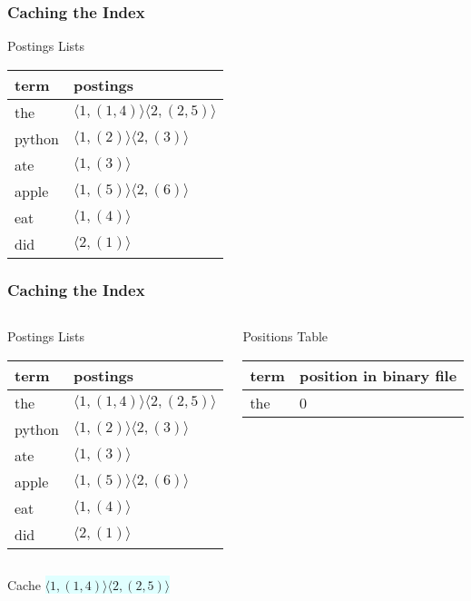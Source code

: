 \documentclass{beamer}
\begin{document}
\begin{frame}
  \frametitle{Caching the Index}

  \begin{block}{Postings Lists}
    \begin{tabular}{ l | l }
      term & postings \\ \hline
      the & $ \langle 1,(1,4) \rangle \langle 2,(2,5) \rangle $ \\
      python & $ \langle 1,(2) \rangle \langle 2,(3) \rangle $ \\
      ate & $ \langle 1,(3) \rangle $ \\
      apple & $ \langle 1,(5) \rangle \langle 2,(6) \rangle $ \\
      eat & $ \langle 1,(4) \rangle $ \\
      did & $ \langle 2,(1) \rangle $ \\
    \end{tabular}
  \end{block}

\end{frame}


\begin{frame}
  \frametitle{Caching the Index}

  \begin{columns}


    \begin{block}{Postings Lists}
      \begin{tabular}{ l | l }
        term & postings \\ \hline
        \rowcolor{LightCyan}
        the & $ \langle 1,(1,4) \rangle \langle 2,(2,5) \rangle $ \\
        python & $ \langle 1,(2) \rangle \langle 2,(3) \rangle $ \\
        ate & $ \langle 1,(3) \rangle $ \\
        apple & $ \langle 1,(5) \rangle \langle 2,(6) \rangle $ \\
        eat & $ \langle 1,(4) \rangle $ \\
        did & $ \langle 2,(1) \rangle $ \\
      \end{tabular}
    \end{block}


    \begin{block}{Positions Table}
      \begin{tabular}{ l | l }
        term & position in binary file \\ \hline
        \rowcolor{LightCyan}
        the & 0 \\
      \end{tabular}
    \end{block}
    
  \end{columns}

  \begin{block}{Cache}
    \colorbox{LightCyan}{$ \langle 1,(1,4) \rangle \langle 2,(2,5) \rangle $}
  \end{block}
\end{frame}
\end{document}

